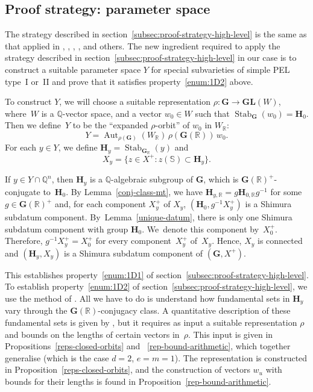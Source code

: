 \documentclass[11pt]{article}
\numberwithin{equation}{section}
\newcommand{\bQ}{\mathbb{Q}}
\newcommand{\bR}{\mathbb{R}}
\newcommand{\bS}{\mathbb{S}}
\newcommand{\gG}{\mathbf{G}}
\newcommand{\gGL}{\mathbf{GL}}
\newcommand{\gH}{\mathbf{H}}
\DeclareMathOperator{\Aut}{Aut}
\DeclareMathOperator{\Stab}{Stab}
\begin{document}
\subsection{Proof strategy: parameter space} \label{subsec:parameter-space}

The strategy described in section~\ref{subsec:proof-strategy-high-level} is the same as that applied in \cite{HP16}, \cite{DR18}, \cite{ExCM}, \cite{QRTUI}, and others. The new ingredient required to apply the strategy described in section~\ref{subsec:proof-strategy-high-level} in our case is to construct a suitable parameter space $Y$ for special subvarieties of simple PEL type~I or~II and prove that it satisfies property~\eqref{enum:1D2} above.

To construct $Y$, we will choose a suitable representation $\rho \colon \gG \to \gGL(W)$, where~$W$ is a $\bQ$-vector space, and a vector $w_0 \in W$ such that $\Stab_{\gG}(w_0) = \gH_0$.
Then we define~$Y$ to be the ``expanded $\rho$-orbit'' of $w_0$ in $W_\bR$:
\[
Y = \Aut_{\rho(\gG)}(W_\bR) \, \rho(\gG(\bR)) \, w_0.
\]
For each $y \in Y$, we define $\gH_y = \Stab_{\gG_\bR}(y)$ and
\[
X_y = \{ z \in X^+ : z(\bS) \subset \gH_y \}.
\]

If $y \in Y \cap \bQ^n$, then $\gH_y$ is a $\bQ$-algebraic subgroup of $\gG$, which is $\gG(\bR)^+$-conjugate to~$\gH_0$.
By Lemma~\ref{conj-class-mt}, we have $\gH_{y,\bR} = g\gH_{0,\bR}g^{-1}$ for some $g \in \gG(\bR)^+$ and, for each component $X_y^+$ of $X_y$, $(\gH_0, g^{-1}X_y^+)$ is a Shimura subdatum component.
By~Lem\-ma~\ref{unique-datum}, there is only one Shimura subdatum component with group $\gH_0$.
We~denote this component by~$X^+_0$. Therefore, $g^{-1}X_y^+=X^+_0$ for every component~$X_y^+$ of~$X_y$.
Hence, $X_y$ is connected and $(\gH_y, X_y)$ is a Shimura subdatum component of $(\gG, X^+)$.

This establishes property~\eqref{enum:1D1} of section~\ref{subsec:proof-strategy-high-level}. To establish property~\eqref{enum:1D2} of section~\ref{subsec:proof-strategy-high-level}, we use the method of \cite[Prop.\,6.3]{QRTUI}.
All we have to do is understand how fundamental sets in $\gH_y$ vary through the $\gG(\bR)$-conjugacy class.
A quantitative description of these fundamental sets is given by \cite[Th.\,1.2]{QRTUI}, but it requires as input a suitable representation $\rho$ and bounds on the lengths of certain vectors in~$\rho$.
This input is given in Propositions~\ref{reps-closed-orbits} and~ \ref{rep-bound-arithmetic}, which together generalise \cite[Prop.\,5.1]{QRTUI} (which is the case $d=2$, $e=m=1$).
The representation is constructed in Proposition~\ref{reps-closed-orbits}, and the construction of vectors $w_u$ with bounds for their lengths is found in Proposition~\ref{rep-bound-arithmetic}.
\end{document}
